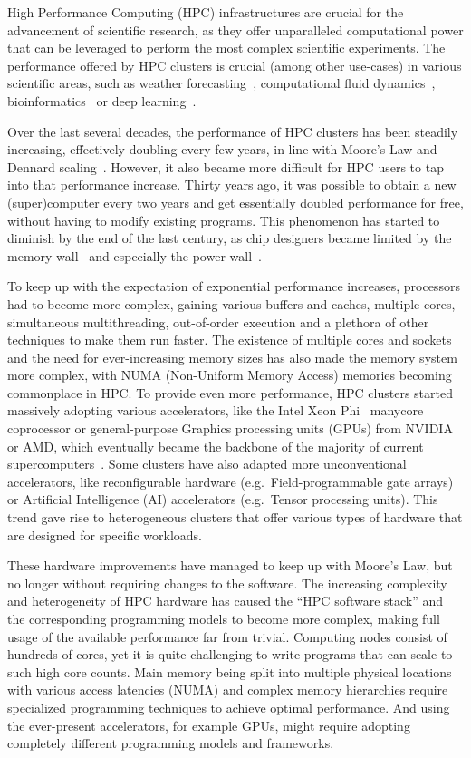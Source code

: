High Performance Computing (HPC) infrastructures are crucial for the advancement of scientific
research, as they offer unparalleled computational power that can be leveraged to perform the most
complex scientific experiments. The performance offered by HPC clusters is crucial (among other
use-cases) in various scientific areas, such as weather forecasting~\cite{wrf},
computational fluid dynamics~\cite{cfd}, bioinformatics~\cite{bioinformatics} or deep
learning~\cite{hpcdl}.

Over the last several decades, the performance of HPC clusters has been steadily increasing,
effectively doubling every few years, in line with Moore's Law and Dennard
scaling~\cite{mooreslaw}. However, it also became more difficult for HPC users to tap into
that performance increase. Thirty years ago, it was possible to obtain a new (super)computer every
two years and get essentially doubled performance for free, without having to modify existing
programs. This phenomenon has started to diminish by the end of the last century, as chip designers
became limited by the memory wall~\cite{memorywall} and especially the power
wall~\cite{powerwall}.

To keep up with the expectation of exponential performance increases, processors had to become more
complex, gaining various buffers and caches, multiple cores, simultaneous multithreading,
out-of-order execution and a plethora of other techniques to make them run faster. The existence of
multiple cores and sockets and the need for ever-increasing memory sizes has also made the memory
system more complex, with NUMA (Non-Uniform Memory Access) memories becoming commonplace in HPC. To
provide even more performance, HPC clusters started massively adopting various accelerators, like
the Intel Xeon Phi~\cite{xeonphi} manycore coprocessor or general-purpose Graphics
processing units (GPUs) from NVIDIA or AMD, which eventually became the backbone of the majority of
current supercomputers~\cite{top500gpu}. Some clusters have also adapted more unconventional
accelerators, like reconfigurable hardware (e.g.\ Field-programmable gate arrays) or Artificial
Intelligence (AI) accelerators (e.g.\ Tensor processing units). This trend gave rise to
heterogeneous clusters that offer various types of hardware that are designed for specific
workloads.

These hardware improvements have managed to keep up with Moore's Law, but no longer without
requiring changes to the software. The increasing complexity and heterogeneity of HPC hardware has
caused the ``HPC software stack'' and the corresponding programming models to become more complex,
making full usage of the available performance far from trivial. Computing nodes consist of
hundreds of cores, yet it is quite challenging to write programs that can scale to such high core
counts. Main memory being split into multiple physical locations with various access latencies
(NUMA) and complex memory hierarchies require specialized programming techniques to achieve optimal
performance. And using the ever-present accelerators, for example GPUs, might require adopting
completely different programming models and frameworks.

